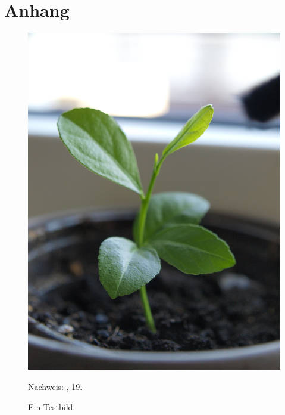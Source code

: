\chapter{Anhang}


\begin{figure}[!h]
 \centering
 \includegraphics[width=0.6\linewidth]{./bilder/citrus.JPG}
 \caption{Ein Testbild.} Nachweis: \cite{Foto.2013}, 19.
 \label{fig:testbild}
\end{figure}

